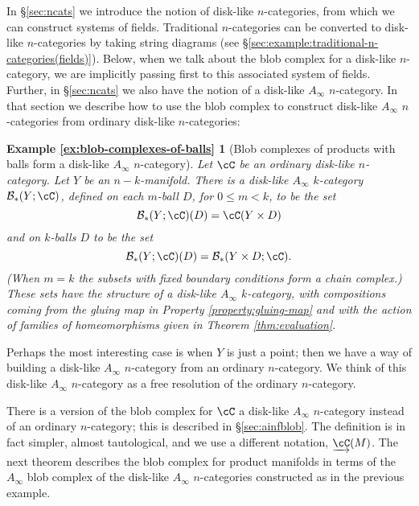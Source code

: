 In \S \ref{sec:ncats} we introduce the notion of disk-like $n$-categories, 
from which we can construct systems of fields.
Traditional $n$-categories can be converted to disk-like $n$-categories by taking string diagrams
(see \S\ref{sec:example:traditional-n-categories(fields)}).
Below, when we talk about the blob complex for a disk-like $n$-category, 
we are implicitly passing first to this associated system of fields.
Further, in \S \ref{sec:ncats} we also have the notion of a disk-like $A_\infty$ $n$-category. 
In that section we describe how to use the blob complex to 
construct disk-like $A_\infty$ $n$-categories from ordinary disk-like $n$-categories:

\newtheorem*{ex:blob-complexes-of-balls}{Example \ref{ex:blob-complexes-of-balls}}

\begin{ex:blob-complexes-of-balls}[Blob complexes of products with balls form a disk-like $A_\infty$ $n$-category]
Let $\cC$ be  an ordinary disk-like $n$-category.
Let $Y$ be an $n{-}k$-manifold. 
There is a disk-like $A_\infty$ $k$-category $\bc_*(Y;\cC)$, defined on each $m$-ball $D$, for $0 \leq m < k$, 
to be the set $$\bc_*(Y;\cC)(D) = \cC(Y \times D)$$ and on $k$-balls $D$ to be the set 
$$\bc_*(Y;\cC)(D) = \bc_*(Y \times D; \cC).$$ 
(When $m=k$ the subsets with fixed boundary conditions form a chain complex.) 
These sets have the structure of a disk-like $A_\infty$ $k$-category, with compositions coming from the gluing map in 
Property \ref{property:gluing-map} and with the action of families of homeomorphisms given in Theorem \ref{thm:evaluation}.
\end{ex:blob-complexes-of-balls}

\begin{rem}
Perhaps the most interesting case is when $Y$ is just a point; 
then we have a way of building a disk-like $A_\infty$ $n$-category from an ordinary $n$-category. %
We think of this disk-like $A_\infty$ $n$-category as a free resolution of the ordinary $n$-category.
\end{rem}

There is a version of the blob complex for $\cC$ a disk-like $A_\infty$ $n$-category
instead of an ordinary $n$-category; this is described in \S \ref{sec:ainfblob}.
The definition is in fact simpler, almost tautological, and we use a different notation, $\cl{\cC}(M)$. 
The next theorem describes the blob complex for product manifolds
in terms of the $A_\infty$ blob complex of the disk-like $A_\infty$ $n$-categories constructed as in the previous example.

